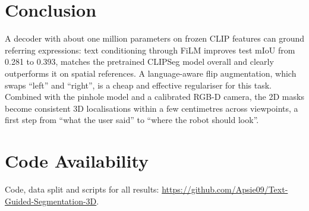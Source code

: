 \documentclass[conference,a4paper]{IEEEtran}
\begin{document}
\section{Conclusion}
\label{sec:conclusion}

A decoder with about one million parameters on frozen CLIP features can ground referring
expressions: text conditioning through FiLM improves test mIoU from 0.281 to 0.393, matches the
pretrained CLIPSeg model overall and clearly outperforms it on spatial references. A language-aware
flip augmentation, which swaps \enquote{left} and \enquote{right}, is a cheap and effective
regulariser for this task. Combined with the pinhole model and a calibrated RGB-D camera, the 2D
masks become consistent 3D localisations within a few centimetres across viewpoints, a first step
from \enquote{what the user said} to \enquote{where the robot should look}.

\section*{Code Availability}

Code, data split and scripts for all results:
\url{https://github.com/Apsie09/Text-Guided-Segmentation-3D}.



\end{document}
